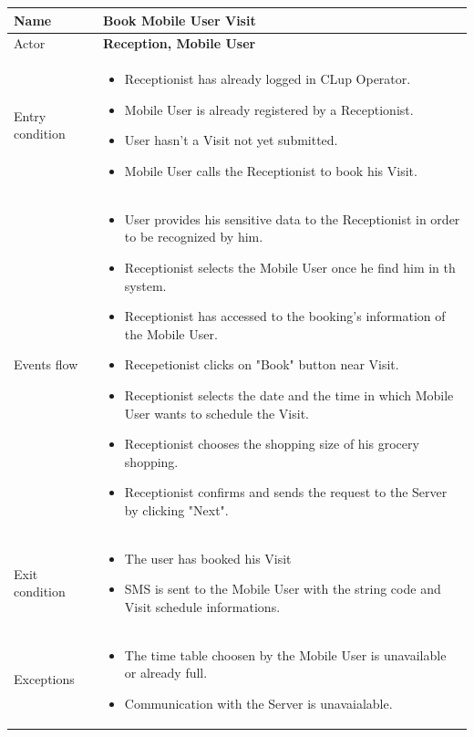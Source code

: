 \begin{tabular}{|p{5cm} | p{7cm} | }
	\hline
	Name & \textbf{Book Mobile User Visit}  \\
	\hline
	Actor & \textbf{Reception, Mobile User} \\
	\hline
	Entry condition &
	\begin{itemize}
		\item Receptionist has already logged in CLup Operator. 
 		\item Mobile User is already registered by a Receptionist.
		\item User hasn't a Visit not yet submitted. 
        \item Mobile User calls the Receptionist to book his Visit.
	\end{itemize} \\
	\hline
	Events flow & 
	\begin{itemize}
		\item User provides his sensitive data to the Receptionist in order to be recognized by him. 
        \item Receptionist selects the Mobile User once he find him in th system.
		\item Receptionist has accessed to the booking's information of the Mobile User.
        \item Recepetionist clicks on "Book" button near Visit.
		\item Receptionist selects the date and the time in which Mobile User wants to schedule the Visit.
		\item Receptionist chooses the shopping size of his grocery shopping.
		\item Receptionist confirms and sends the request to the Server by clicking "Next".
	\end{itemize} \\
	\hline
	Exit condition & \begin{itemize}
	\item The user has booked his Visit
    \item SMS is sent to the Mobile User with the string code and Visit schedule informations. 
    \end{itemize}\\
	\hline 
	Exceptions & 
	\begin{itemize}
    \item The time table choosen by the Mobile User is unavailable or already full.
    \item Communication with the Server is unavaialable.
    \end{itemize} \\
	\hline
\end{tabular}
 
